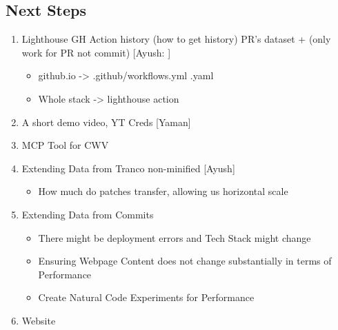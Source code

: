 \subsection{Next Steps}
\begin{enumerate}
    \item Lighthouse GH Action history (how to get history) PR's dataset + (only work for PR not commit) [Ayush: ]
    \begin{itemize}
        \item github.io -> .github/workflows.yml .yaml
        \item Whole stack -> lighthouse action
    \end{itemize}
    \item A short demo video, YT Creds [Yaman]
    \item MCP Tool for CWV
    \item Extending Data from Tranco non-minified [Ayush]
    \begin{itemize}
        \item How much do patches transfer, allowing us horizontal scale
    \end{itemize}
    \item Extending Data from Commits
    \begin{itemize}
        \item There might be deployment errors and Tech Stack might change
        \item Ensuring Webpage Content does not change substantially in terms of Performance
        \item Create Natural Code Experiments for Performance
    \end{itemize}
        \item Website


\end{enumerate}

